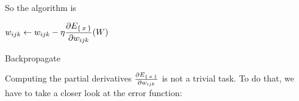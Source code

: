 So the algorithm is

\begin{algorithm}[h]
    \begin{algorithmic}
                            \State $\displaystyle w_{ijk} \gets w_{ijk} - \eta \frac{\partial E_{\Set{x}}}{\partial w_{ijk}} (W)$
                        \EndFor
                    \EndFor
                \EndFor
            \EndWhile
        \EndFunction
    \end{algorithmic}
\caption{Backpropagate}
\label{alg:backpropagate}
\end{algorithm}

Computing the partial derivatives $\frac{\partial E_{\Set{x}}}{\partial w_{ijk}}$
is not a trivial task. To do that, we have to take a closer look at the
error function:




